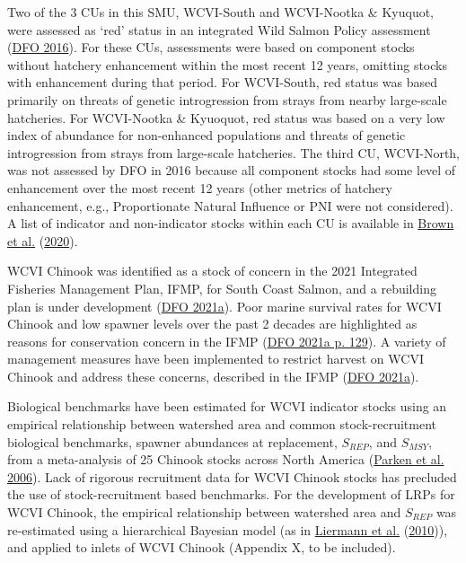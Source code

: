 \documentclass[11pt]{book}
\begin{document}
Two of the 3 CUs in this SMU, WCVI-South and WCVI-Nootka \& Kyuquot, were assessed as `red' status in an integrated Wild Salmon Policy assessment (\protect\hyperlink{ref-dfoIntegratedBiologicalStatus2016}{DFO 2016}). For these CUs, assessments were based on component stocks without hatchery enhancement within the most recent 12 years, omitting stocks with enhancement during that period. For WCVI-South, red status was based primarily on threats of genetic introgression from strays from nearby large-scale hatcheries. For WCVI-Nootka \& Kyuoquot, red status was based on a very low index of abundance for non-enhanced populations and threats of genetic introgression from strays from large-scale hatcheries. The third CU, WCVI-North, was not assessed by DFO in 2016 because all component stocks had some level of enhancement over the most recent 12 years (other metrics of hatchery enhancement, e.g., Proportionate Natural Influence or PNI were not considered). A list of indicator and non-indicator stocks within each CU is available in \protect\hyperlink{ref-brown2020SummaryAbundance2020}{Brown et al.} (\protect\hyperlink{ref-brown2020SummaryAbundance2020}{2020}).

WCVI Chinook was identified as a stock of concern in the 2021 Integrated Fisheries Management Plan, IFMP, for South Coast Salmon, and a rebuilding plan is under development (\protect\hyperlink{ref-dfoIntegratedFisheriesManagement2021}{DFO 2021a}). Poor marine survival rates for WCVI Chinook and low spawner levels over the past 2 decades are highlighted as reasons for conservation concern in the IFMP (\protect\hyperlink{ref-dfoIntegratedFisheriesManagement2021}{DFO 2021a p. 129}). A variety of management measures have been implemented to restrict harvest on WCVI Chinook and address these concerns, described in the IFMP (\protect\hyperlink{ref-dfoIntegratedFisheriesManagement2021}{DFO 2021a}).

Biological benchmarks have been estimated for WCVI indicator stocks using an empirical relationship between watershed area and common stock-recruitment biological benchmarks, spawner abundances at replacement, \(S_{REP}\), and \(S_{MSY}\), from a meta-analysis of 25 Chinook stocks across North America (\protect\hyperlink{ref-parkenHabitatbasedMethodsEstimate2006}{Parken et al. 2006}). Lack of rigorous recruitment data for WCVI Chinook stocks has precluded the use of stock-recruitment based benchmarks. For the development of LRPs for WCVI Chinook, the empirical relationship between watershed area and \(S_{REP}\) was re-estimated using a hierarchical Bayesian model (as in \protect\hyperlink{ref-liermannUsingAccessibleWatershed2010}{Liermann et al.} (\protect\hyperlink{ref-liermannUsingAccessibleWatershed2010}{2010})), and applied to inlets of WCVI Chinook (Appendix X, to be included).
\end{document}
